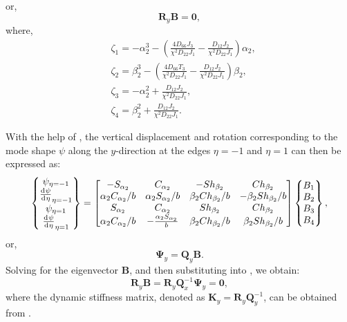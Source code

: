 \documentclass[preprint,12pt,number]{elsarticle}
\newcommand{\id}{\mathrm{d}\mkern1mu}
\begin{document}
%
or,
%
\begin{equation}\label{eq:ABy1}
\mathbf{R}_y \mathbf{B} = \mathbf{0},
\end{equation}
%
where,
%
\begin{equation}\label{eq:gammay}
\begin{split}
	&\zeta_1=-\alpha_2^3-\left( \frac{4D_{66}J_3}{\chi^2D_{22}J_1}  - \frac{D_{12}J_2}{\chi^2D_{22}J_1}  \right)\alpha_2,\\
	&\zeta_2=\beta_2^3-\left( \frac{4D_{66}T_3}{\chi^2D_{22}J_1}  - \frac{D_{12}J_2}{\chi^2D_{22}J_1}  \right)\beta_2,\\
	&\zeta_3=-\alpha_2^2+\frac{D_{12}J_2}{\chi^2D_{22}J_1},\\
	&\zeta_4=\beta_2^2+\frac{D_{12}J_2}{\chi^2D_{22}J_1}.
\end{split}
\end{equation}

With the help of , the vertical displacement and rotation corresponding to the mode shape $\psi$ along the $y$-direction at the edges $\eta = -1$ and $\eta = 1$ can then be expressed as:
%
\begin{equation}\label{eq:UBy}
\begin{split}
	\begin{Bmatrix}
		\psi_{\eta=-1}\\\frac{\id \psi}{\id \eta}_{\eta=-1}\\\psi_{\eta=1}\\\frac{\id \psi}{\id \eta}_{\eta=1}
	\end{Bmatrix}
	= \begin{bmatrix}
		-S_{\alpha_2} & C_{\alpha_2} & -Sh_{\beta_2} & Ch_{\beta_2} \\
		\alpha_2 C_{\alpha_2}/b & \alpha_2 S_{\alpha_2}/b & \beta_2 Ch_{\beta_2}/b & -\beta_2 Sh_{\beta_2}/b \\
		S_{\alpha_2} & C_{\alpha_2} & Sh_{\beta_2} & Ch_{\beta_2} \\
		\alpha_2 C_{\alpha_2}/b & -\frac{\alpha_2 S_{\alpha_2}}{b} & \beta_2 Ch_{\beta_2}/b & \beta_2 Sh_{\beta_2}/b
	\end{bmatrix}
	\begin{Bmatrix}
		B_1\\B_2\\B_3\\B_4
	\end{Bmatrix},		
\end{split}
\end{equation}
%
or,
%
\begin{equation}\label{eq:UBy1}
\mathbf{\Psi}_y= \mathbf{Q}_y\mathbf{B}.
\end{equation}
%
Solving for the eigenvector $\mathbf{B}$, and then substituting into , we obtain:
%
\begin{equation}\label{eq:DSM_eqy}
\mathbf{R}_y\mathbf{B}=\mathbf{R}_y \mathbf{Q}_x^{-1} 
\mathbf{\Psi}_y = \mathbf{0},
\end{equation}
%
where the dynamic stiffness matrix, denoted as $\mathbf{K}_y = \mathbf{R}_y \mathbf{Q}_y^{-1}$, can be obtained from .
\end{document}
